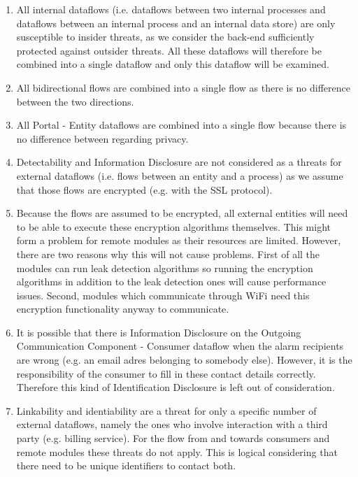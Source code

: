\begin{enumerate}
  \item All internal dataflows (i.e. dataflows between two internal processes
  and dataflows between an internal process and an internal data store) are only
  susceptible to insider threats, as we consider the back-end sufficiently
  protected against outsider threats. All these dataflows will therefore be
  combined into a single dataflow and only this dataflow will be examined.
  \item All bidirectional flows are combined into a single flow as there is no
  difference between the two directions. 
  \item All Portal - Entity dataflows are combined into a single flow because
  there is no difference between regarding privacy. %
  \item Detectability and Information Disclosure are not considered as a threats
  for external dataflows (i.e. flows between an entity and a process) as we
  assume that those flows are encrypted (e.g. with the SSL protocol).
  \item Because the flows are assumed to be encrypted, all external entities
  will need to be able to execute these encryption algorithms themselves. This
  might form a problem for remote modules as their resources are limited.
  However, there are two reasons why this will not cause problems. First of all
  the modules can run leak detection algorithms so running the encryption
  algorithms in addition to the leak detection ones will cause performance
  issues. Second, modules which communicate through WiFi need this encryption
  functionality anyway to communicate.
  \item It is possible that there is Information Disclosure on the Outgoing
  Communication Component - Consumer dataflow when the alarm recipients are
  wrong (e.g. an email adres belonging to somebody else). However, it is the
  responsibility of the consumer to fill in these contact details correctly.
  Therefore this kind of Identification Disclosure is left out of consideration.
  \item Linkability and identiability are a threat for only a specific
  number of external dataflows, namely the ones who involve interaction with a
  third party (e.g. billing service). For the flow from and towards consumers
  and remote modules these threats do not apply. This is logical considering
  that there need to be unique identifiers to contact both.


\end{enumerate}
